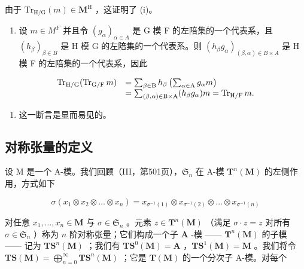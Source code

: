 由于 \(\mathrm{Tr}_{\mathrm{H} / \mathrm{G}}(m)\in \mathbf{M}^{\mathrm{H}}\) ，这证明了 (i)。

\begin{enumerate}
\def\labelenumi{(\roman{enumi})}
\setcounter{enumi}{1}
\tightlist
\item
  设 \(m \in M^{F}\) 并且令 \((g_{\alpha})_{\alpha \in A}\) 是 G 模 F 的左陪集的一个代表系，且 \((h_{\beta})_{\beta \in B}\) 是 H 模 G 的左陪集的一个代表系。则 \((h_{\beta}g_{\alpha})_{(\beta,\alpha) \in B \times A}\) 是 H 模 F 的左陪集的一个代表系，因此
\end{enumerate}

\[
\begin{array}{r l} \operatorname{Tr} _ {\mathrm{H} / \mathrm{G}} (\operatorname{Tr} _ {\mathrm{G} / \mathrm{F}} m) & = \sum_ {\beta \in \mathrm{B}} h _ {\beta} \left(\sum_ {\alpha \in \mathrm{A}} g _ {\alpha} m\right) \\ & = \sum_ {(\beta , \alpha) \in \mathrm{B} \times \mathrm{A}} (h _ {\beta} g _ {\alpha}) m = \operatorname{Tr} _ {\mathrm{H} / \mathrm{F}} m. \end{array}
\]

\begin{enumerate}
\def\labelenumi{(\roman{enumi})}
\setcounter{enumi}{2}
\tightlist
\item
  这一断言是显而易见的。
\end{enumerate}

\subsection{对称张量的定义}

设 M 是一个 A-模。我们回顾（III，第501页），\(\mathfrak{S}_n\) 在 A-模 \(\mathbf{T}^n (\mathbf{M})\) 的左侧作用，方式如下

\[
\sigma \left(x _ {1} \otimes x _ {2} \otimes \dots \otimes x _ {n}\right) = x _ {\sigma^ {- 1} (1)} \otimes x _ {\sigma^ {- 1} (2)} \otimes \dots \otimes x _ {\sigma^ {- 1} (n)}
\]

对任意 \(x_{1},\ldots,x_{n}\in\mathbf{M}\) 与 \(\sigma\in\mathfrak{S}_{n}\) 。元素 \(z\in\mathbf{T}^{n}(\mathbf{M})\) （满足 \(\sigma\cdot z=z\) 对所有 \(\sigma\in\mathfrak{S}_{n}\) ）称为 \(n\) 阶对称张量；它们构成一个子 \(\mathbf{A}\) -模 —— \(\mathbf{T}^{n}(\mathbf{M})\) 的子模 —— 记为 \(\mathbf{T}\mathbf{S}^{n}(\mathbf{M})\) ；我们有 \(\mathbf{T}\mathbf{S}^{0}(\mathbf{M})=\mathbf{A}\) ，\(\mathbf{T}\mathbf{S}^{1}(\mathbf{M})=\mathbf{M}\) 。我们将令 \(\mathbf{T}\mathbf{S}(\mathbf{M}) = \bigoplus_{n=0}^{\infty} \mathbf{T}\mathbf{S}^{n}(\mathbf{M})\) ；它是 \(\mathbf{T}(\mathbf{M})\) 的一个分次子 A-模。对每个

